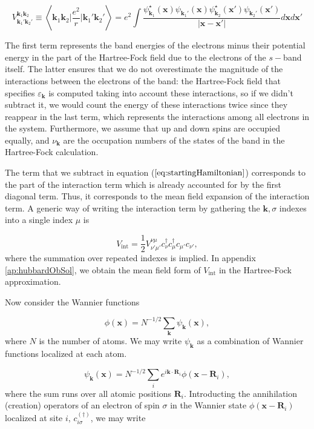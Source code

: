 \begin{equation}\label{eq:integrals}
V^{\bm k_1 \bm k_2}_{\bm k_1' \bm k_2'} \equiv \left\langle \bm k_1 \bm k_2 \bigg| \frac{e^2}{r} \bigg| \bm k_1' \bm k_2' \right\rangle  =  e^2 \int \frac{\psi_{\bm k_1}^\star (\bm x) \psi_{\bm k_1'} (\bm x) \psi_{\bm k_2}^\star (\bm x') \psi_{\bm k_2'}(\bm x') }{| \bm x - \bm x' |} d\bm x d\bm x'
\end{equation}

The first term represents the band energies of the electrons minus their potential energy in the part of the Hartree-Fock field due to the electrons of the $s-$band itself.
The latter ensures that we do not overestimate the magnitude of the interactions between the electrons of the band: the Hartree-Fock field that specifies $\varepsilon_{\bm k}$ is computed taking into account these interactions, so if we didn't subtract it, we would count the energy of these interactions twice since they reappear in the last term, which  represents the interactions among all electrons in the system.
Furthermore, we assume that up and down spins are occupied equally, and $\nu_{\bm k}$ are the occupation numbers of the states of the band in the Hartree-Fock calculation. 

The term that we subtract in equation ($\ref{eq:startingHamiltonian}$) corresponds to the part of the interaction term which is already accounted for by the first diagonal  term.
Thus, it corresponds to the mean field expansion of the interaction term.
A generic way of writing the interaction term by gathering the $\bm k, \sigma$ indexes into a single index $\mu$ is

\begin{equation}\label{eq:vInt}
V_{\text{int}} = \frac{1}{2} V^{\nu\mu}_{\nu'\mu'} c_\nu^\dagger c_\mu^\dagger c_{\mu'} c_{\nu'} ,
\end{equation}
where the summation over repeated indexes is implied.
In appendix \ref{ap:hubbardObSol}, we obtain the mean field form of $V_{\text{int}}$ in the Hartree-Fock approximation.

Now consider the Wannier functions

\begin{equation}
\phi(\bm x) = N^{-1/2} \sum_{\bm k} \psi_{\bm k} (\bm x) , 
\end{equation}
where $N$ is the number of atoms.
We may write $\psi_{\bm k}$ as a combination of Wannier functions localized at each atom.

\begin{equation}
\psi_{\bm k} (\bm x) = N^{-1/2} \sum_i e^{i \bm k \cdot \bm R_i} \phi (\bm x - \bm R_i) ,
\end{equation}
where the sum runs over all atomic positions $\bm R_i$. 
Introducting the annihilation (creation) operators of an electron of spin $\sigma$ in the Wannier state $\phi (\bm x - \bm R_i)$ localized at site $i$, $c_{i\sigma}^{(\dagger)}$, we may write

